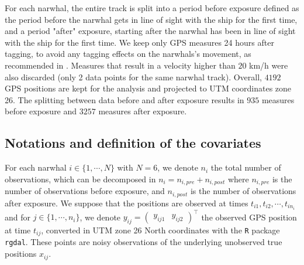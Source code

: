 \documentclass[11pt]{article}
\newcommand {\1}{\mathbb{1}}
\theoremstyle{definition}
\theoremstyle{remark}
\theoremstyle{remark}
\begin{document}
For each narwhal, the entire track is split into a period before exposure defined as the period before the narwhal gets in line of sight with the ship for the first time, and a period "after" exposure, starting after the narwhal has been in line of sight with the ship for the first time. We keep only GPS measures 24 
hours after tagging, to avoid any tagging effects on the narwhals's movement, as recommended in \cite{heide-jorgensen_behavioral_2021}.
Measures that result in a velocity higher than $20$ km/h were also discarded (only 2 data points for the same narwhal track).
Overall, $4192$ GPS positions are kept for the analysis and projected to UTM coordinates zone 26. The splitting between data before and after exposure results in $935$ measures before exposure and $3257$ measures after exposure.

\subsection{Notations and definition of the covariates}
\label{subsection: covariates}

For each narwhal $i \in \{1,\cdots,N\}$ with $N=6$, we denote $n_i$ the total number of observations, which can be decomposed in $n_i=n_{i,pre}+n_{i,post}$ where $n_{i,pre}$ is the number of observations before exposure, and $n_{i,post}$ is the number of observations after exposure. We suppose that the positions are observed at times $t_{i1}, t_{i2}, \cdots,t_{in_i}$ and  for $j \in \{1,\cdots,n_i\}$, we denote $y_{ij}=\begin{pmatrix} y_{ij1} & y_{ij2} \end{pmatrix}^\top$ the observed GPS position at time $t_{ij}$, converted in UTM zone 26 North coordinates with the \texttt{R} package \texttt{rgdal}. These points are noisy observations of the underlying unobserved true positions $x_{ij}$.\\
\end{document}
